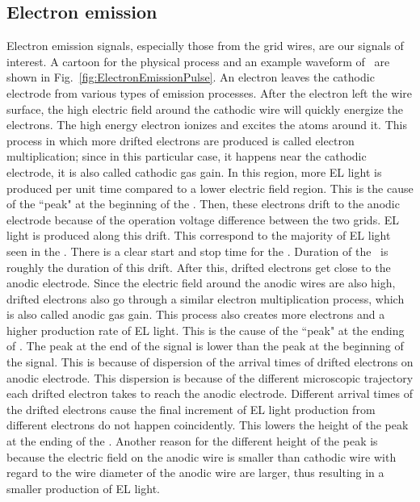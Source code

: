 \subsection{Electron emission} 
\label{sec:events ee}
Electron emission signals, especially those from the grid wires, are our signals of interest. A cartoon for the physical process and an example waveform of \ees\ are shown in Fig.~\ref{fig:ElectronEmissionPulse}. An electron leaves the cathodic electrode from various types of emission processes. After the electron left the wire surface, the high electric field around the cathodic wire will quickly energize the electrons. The high energy electron ionizes and excites the atoms around it. This process in which more drifted electrons are produced is called electron multiplication; since in this particular case, it happens near the cathodic electrode, it is also called cathodic gas gain. In this region, more EL light is produced per unit time compared to a lower electric field region. This is the cause of the ``peak" at the beginning of the \ees .  Then, these electrons drift to the anodic electrode because of the operation voltage difference between the two grids. EL light is produced along this drift. This correspond to the majority of EL light seen in the \ees . There is a clear start and stop time for the \ees . Duration of the \ees\ is roughly the duration of this drift. After this, drifted electrons get close to the anodic electrode. Since the electric field around the anodic wires are also high, drifted electrons also go through a similar electron multiplication process, which is also called anodic gas gain. This process also creates more electrons and a higher production rate of EL light. This is the cause of the ``peak" at the ending of \ees . The peak at the end of the signal is lower than the peak at the beginning of the signal. This is because of dispersion of the arrival times of drifted electrons on anodic electrode. This dispersion is because of the different microscopic trajectory each drifted electron takes to reach the anodic electrode. Different arrival times of the drifted electrons cause the final increment of EL light production from different electrons do not happen coincidently. This lowers the height of the peak at the ending of the \ees . Another reason for the different height of the peak is because the electric field on the anodic wire is smaller than cathodic wire with regard to the wire diameter of the anodic wire are larger, thus resulting in a smaller production of EL light.

